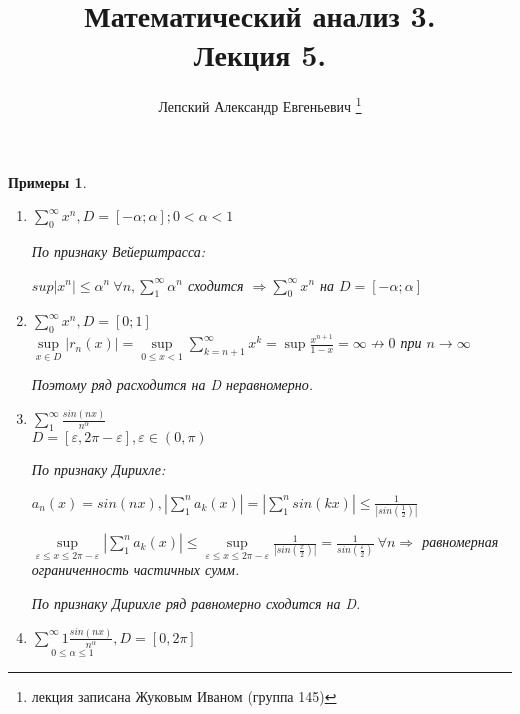 \documentclass[a4paper, 12pt]{article}
\title{\vspace{-2.0cm}Математический анализ 3.\\Лекция 5.}
\author{Лепский Александр Евгеньевич
        \footnote{лекция записана Жуковым Иваном (группа 145)}}
\newtheorem{Examples}{Примеры}
\begin{document}
    \maketitle

    \begin{Examples}
    \leavevmode
        \begin{enumerate}
            \item
                \(\sum^{\infty}_{0} x^n, D =[-\alpha; \alpha]; 0 < \alpha < 1\)

                По признаку Вейерштрасса:

                \( sup \left| x^n \right|  \le \alpha^n \ \forall n, 
                \sum^{\infty}_{1} \alpha^n\) сходится \( \Rightarrow
                \sum^{\infty}_{0} x^n\) на \(D = [-\alpha; \alpha]\)
            \item
                \( \sum^{\infty}_{0} x^n, D = [0; 1] \) \\
                \( \underset{x \in D}{\sup} \left| r_n(x) \right| =
                \underset{0 \le x < 1}{\sup} \sum^{\infty}_{k = n + 1} 
                x^k = \sup \frac{x ^ {n + 1}}{1 - x}
                = \infty \not \rightarrow 0\) при \(n \rightarrow \infty\)

                Поэтому ряд расходится на D неравномерно.

            \item
                \( \sum^{\infty}_{1} \frac{sin(nx)}{n ^ \alpha}\) \\
                \( D = [\varepsilon, 2\pi - \varepsilon], \varepsilon
                \in (0, \pi)\)

                По признаку Дирихле:

                \( a_n(x) = sin(nx), \left| \sum^{n}_{1} a_k(x) \right| =
                \left| \sum^{n}_{1}sin(kx) \right|
                \le \frac{1}{\left| sin(\frac{1}{2}) \right|}\)

                \( \underset{\varepsilon \le x \le 2\pi - \varepsilon}{\sup} 
                \left| \sum^{n}_{1} a_k(x) \right| \le
                \underset{\varepsilon \le x \le 2\pi - \varepsilon}{\sup}
                \frac{1}{\left| sin(\frac{x}{2}) \right|} =
                \frac{1}{sin(\frac{\varepsilon}{2})} \ \forall n \Rightarrow\)
                равномерная ограниченность частичных сумм.

                По признаку Дирихле ряд равномерно сходится на D.

            \item
                \( \underset{0 \le \alpha \le 1}{\sum^{\infty}{1}
                \frac{sin(nx)}{n ^ \alpha}}, D = [0, 2\pi]\)


\end{enumerate}
\end{Examples}
\end{document}

